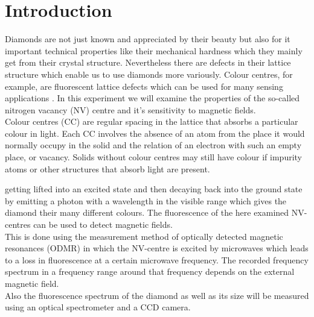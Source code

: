 \section{Introduction}

Diamonds are not just known and appreciated by their beauty but also for it important technical properties like their mechanical hardness which they mainly get from their crystal structure. Nevertheless there are defects in their lattice structure which enable us to use diamonds more variously. Colour centres, for example, are fluorescent lattice defects which can be used for many sensing applications \cite{anleitung}. In this experiment we will examine the properties of the so-called nitrogen vacancy (NV) centre and it's sensitivity to magnetic fields.\\

Colour centres (CC) are  regular spacing in the lattice that absorbs a particular colour in light. Each CC involves the absence of an atom from the place it would normally occupy in the solid and the relation of an electron with such an empty place, or vacancy. Solids without colour centres may still have colour if impurity atoms or other structures that absorb light are present.

 getting lifted into an excited state and then decaying back into the ground state by emitting a photon with a wavelength in the visible range which gives the diamond their many different colours. The fluorescence of the here examined NV-centres can be used to detect magnetic fields.\\

This is done using the measurement method of optically detected magnetic resonances (ODMR) in which the NV-centre is excited by microwaves which leads to a loss in fluorescence at a certain microwave frequency. The recorded frequency spectrum in a frequency range around that frequency depends on the external magnetic field.\\

Also the fluorescence spectrum of the diamond as well as its size will be measured using an optical spectrometer and a CCD camera.